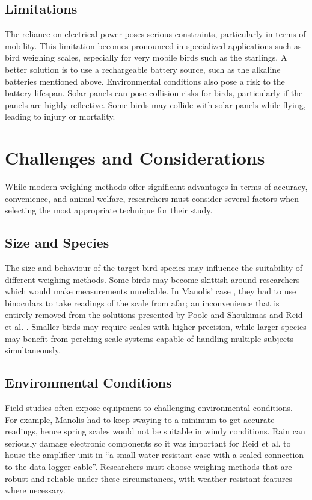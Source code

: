 \documentclass[class=report,11pt,crop=false]{standalone}
\begin{document}
\subsection{Limitations}
The reliance on electrical power poses serious constraints, particularly in terms of mobility. This limitation becomes pronounced in specialized applications such as bird weighing scales, especially for very mobile birds such as the starlings. A better solution is to use a rechargeable battery source, such as the alkaline batteries mentioned above. Environmental conditions also pose a risk to the battery lifespan. Solar panels can pose collision risks for birds, particularly if the panels are highly reflective. Some birds may collide with solar panels while flying, leading to injury or mortality.
 

\section{Challenges and Considerations}
While modern weighing methods offer significant advantages in terms of accuracy, convenience, and animal welfare, researchers must consider several factors when selecting the most appropriate technique for their study.

\subsection{Size and Species}
The size and behaviour of the target bird species may influence the suitability of different weighing methods. Some birds may become skittish around researchers which would make measurements unreliable. In Manolis’ case \cite{manoils2024simple}, they had to use binoculars to take readings of the scale from afar; an inconvenience that is entirely removed from the solutions presented by Poole and Shoukimas \cite{poole1982scale} and Reid et al. \cite{reid1999measurement}. Smaller birds may require scales with higher precision, while larger species may benefit from perching scale systems capable of handling multiple subjects simultaneously.

\subsection{Environmental Conditions}
Field studies often expose equipment to challenging environmental conditions. For example, Manolis \cite{manoils2024simple} had to keep swaying to a minimum to get accurate readings, hence spring scales would not be suitable in windy conditions. Rain can seriously damage electronic components so it was important for Reid et al. \cite{reid1999measurement} to house the amplifier unit in “a small water-resistant case with a sealed connection to the data logger cable”. Researchers must choose weighing methods that are robust and reliable under these circumstances, with weather-resistant features where necessary.
\end{document}
